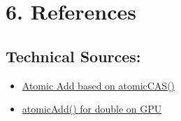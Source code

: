 \documentclass[letterpaper,12pt]{article}
\theoremstyle{remark}
\begin{document}
\section*{6. References}


\subsection*{Technical Sources:}

\begin{itemize}

    \item \href{https://docs.nvidia.com/cuda/cuda-c-programming-guide/index.html#atomic-functions}{Atomic Add based on atomicCAS()}
    \item \href{https://stackoverflow.com/questions/16077464/atomicadd-for-double-on-gpu}{atomicAdd() for double on GPU}
     \end{itemize}
\end{document}
